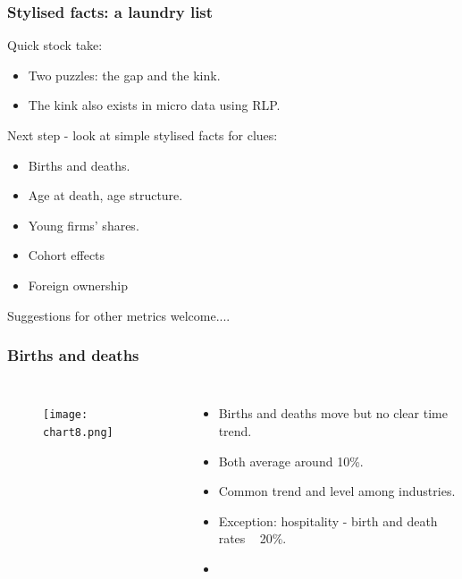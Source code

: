 \documentclass{beamer}
\begin{document}
\begin{frame}
\frametitle{Stylised facts: a laundry list}

Quick stock take:

\begin{itemize}
\item Two puzzles: the gap and the kink.
\item The kink also exists in micro data using RLP. 
\end{itemize}

Next step - look at simple stylised facts for clues:

\begin{itemize}
\item Births and deaths.
\item Age at death, age structure. 
\item Young firms' shares.
\item Cohort effects
\item Foreign ownership

\end{itemize}

Suggestions for other metrics welcome....



\end{frame}



\begin{frame}
\frametitle{Births and deaths}

\begin{columns}


\begin{figure}
\centering
\texttt{[image: chart8.png]}
\end{figure}


\begin{itemize}
\item Births and deaths move but no clear time trend.
\item Both average around 10\%.
\item Common trend and level among industries.
\item Exception: hospitality - birth and death rates ~ 20\%.
\item \href{https://www.rapidcharts.io/productivity}{}
\end{itemize}


\end{columns}
\end{frame}
\end{document}

